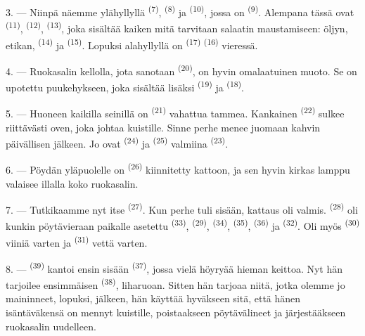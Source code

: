 3. --- Niinpä näemme ylähyllyllä  \textsuperscript{(7)},
 \textsuperscript{(8)} ja  \textsuperscript{(10)},
jossa on  \textsuperscript{(9)}. Alempana tässä ovat
 \textsuperscript{(11)},  \textsuperscript{(12)},
 \textsuperscript{(13)}, joka sisältää kaiken mitä tarvitaan
salaatin maustamiseen: öljyn, etikan,  \textsuperscript{(14)} ja
 \textsuperscript{(15)}. Lopuksi alahyllyllä on 
\textsuperscript{(17)}  \textsuperscript{(16)} vieressä.

4. --- Ruokasalin kellolla, jota sanotaan 
\textsuperscript{(20)}, on hyvin omalaatuinen muoto. Se on upotettu
puukehykseen, joka sisältää lisäksi 
\textsuperscript{(19)} ja  \textsuperscript{(18)}.

\VUsaut{4.6mm}
\VUsaut{3.0mm}

5. --- Huoneen kaikilla seinillä on 
\textsuperscript{(21)} vahattua tammea. Kankainen 
\textsuperscript{(22)} sulkee riittävästi oven, joka johtaa kuistille. Sinne
perhe menee juomaan kahvin päivällisen jälkeen. Jo ovat 
\textsuperscript{(24)} ja  \textsuperscript{(25)} valmiina
 \textsuperscript{(23)}.

6. --- Pöydän yläpuolelle on  \textsuperscript{(26)}
kiinnitetty kattoon, ja sen hyvin kirkas lamppu valaisee illalla koko
ruokasalin.

7. --- Tutkikaamme nyt itse  \textsuperscript{(27)}. Kun
perhe tuli sisään, kattaus oli valmis. 
\textsuperscript{(28)} oli kunkin pöytävieraan paikalle asetettu
 \textsuperscript{(33)}, 
\textsuperscript{(29)},  \textsuperscript{(34)},
 \textsuperscript{(35)}, 
\textsuperscript{(36)} ja  \textsuperscript{(32)}. Oli myös
 \textsuperscript{(30)} viiniä varten ja 
\textsuperscript{(31)} vettä varten.

8. ---  \textsuperscript{(39)} kantoi ensin sisään
 \textsuperscript{(37)}, jossa vielä höyryää hieman keittoa.
Nyt hän tarjoilee ensimmäisen  \textsuperscript{(38)},
liharuoan. Sitten hän tarjoaa niitä, jotka olemme jo maininneet, lopuksi,
 jälkeen, hän käyttää hyväkseen sitä, että hänen
isäntäväkensä on mennyt kuistille, poistaakseen pöytävälineet ja järjestääkseen
ruokasalin uudelleen.

